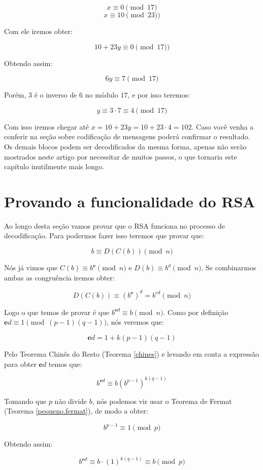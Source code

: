 $$x \equiv 0 \pmod{17}$$
$$x \equiv 10 \pmod{23})$$

Com ele iremos obter: 

$$10 + 23y \equiv 0 \pmod{17})$$

Obtendo assim:

$$6y \equiv 7 \pmod{17}$$

Por\'em, $3$ \'e o inverso de $6$ no m\'odulo $17$, e por isso teremos:

$$y \equiv 3 \cdot 7 \equiv 4 \pmod{17}$$

Com isso iremos chegar at\'e $x = 10 + 23y = 10 + 23 \cdot 4 = 102$. Caso voc\^e venha a conferir na se\c{c}\~ao sobre codifica\c{c}\~ao de mensagens poder\'a confirmar o resultado. Os demais blocos podem ser decodificados da mesma forma, apenas n\~ao ser\~ao mostrados neste artigo por necessitar de muitos passos, o que tornaria este cap\'itulo inutilmente mais longo.

\section{Provando a funcionalidade do RSA}

Ao longo desta se\c{c}\~ao vamos provar que o RSA funciona no processo de decodifica\c{c}\~ao. Para podermos fazer isso teremos que  provar que:

$$b \equiv D(C(b)) \pmod{n}$$

N\'os j\'a vimos que $C(b) \equiv b^\textbf{e} \pmod{n}$ e $D(b) \equiv b^d\pmod{n}$. Se combinarmos ambas as congru\^encia iremos obter:

$$D(C(b)) \equiv {(b^\textbf{e})}^d = b^{ed}\pmod{n}$$

Logo o que temos de provar \'e que $b^{\textbf{e}d} \equiv b \pmod{n}$. Como por defini\c{c}\~ao $\textbf{e}d \equiv 1 \pmod{(p-1)(q-1)}$, n\'os veremos que:

$$\textbf{e}d = 1+k(p-1)(q-1)$$

Pelo Teorema Chin\^es do Resto (Teorema \ref{chines}) e levando em conta a express\~ao para obter $\textbf{e}d$ temos que:

$$b^{\textbf{e}d} \equiv b(b^{p-1})^{k(q-1)}$$

Tomando que $p$ n\~ao divide $b$, n\'os podemos vir usar o Teorema de Fermat (Teorema \ref{pequeno.fermat}), de modo a obter:

$$b^{p-1} \equiv 1 \pmod{p}$$

Obtendo assim:

$$b^{\textbf{e}d} \equiv b \cdot (1)^{k(q-1)}\equiv b \pmod{p}$$

